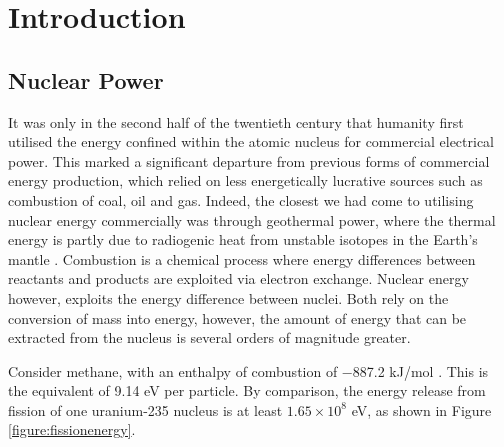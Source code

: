\chapter{Introduction}

\section{Nuclear Power}

It was only in the second half of the twentieth century that humanity first utilised the energy confined within the atomic nucleus for commercial electrical power. This marked a significant departure from previous forms of commercial energy production, which relied on less energetically lucrative sources such as combustion of coal, oil and gas. Indeed, the closest we had come to utilising nuclear energy commercially was through geothermal power, where the thermal energy is partly due to radiogenic heat from unstable isotopes in the Earth's mantle \cite{gando2011partial} . 
Combustion is a chemical process where energy differences between reactants and products are exploited via electron exchange. Nuclear energy however, exploits the energy difference between nuclei. Both rely on the conversion of mass into energy, however, the amount of energy that can be extracted from the nucleus is several orders of magnitude greater.

Consider methane, with an enthalpy of combustion of −887.2 kJ/mol \cite{thornton1917xv}. This is the equivalent of 9.14 eV per particle. By comparison, the energy release from fission of one uranium-235 nucleus is at least $1.65 \times 10^{8}$ eV, as shown in Figure \ref{figure:fissionenergy}.

